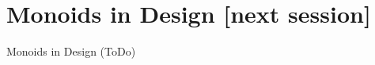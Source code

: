 \documentclass{beamer}
\begin{document}
\section{Monoids in Design [next session]}

\begin{frame}{Monoids in Design (ToDo)}
\end{frame}


\end{document}
